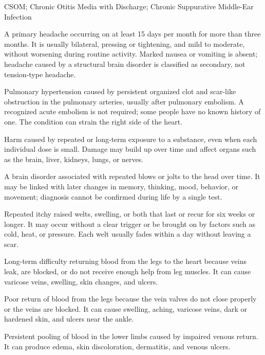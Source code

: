 \synonyms
CSOM; Chronic Otitis Media with Discharge; Chronic Suppurative Middle-Ear Infection

 A primary headache occurring on at
least 15 days per month for more than three months. It is usually bilateral,
pressing or tightening, and mild to moderate, without worsening during routine
activity. Marked nausea or vomiting is absent; headache caused by a structural
brain disorder is classified as secondary, not tension-type headache.

 Pulmonary
hypertension caused by persistent organized clot and scar-like obstruction in
the pulmonary arteries, usually after pulmonary embolism. A recognized acute
embolism is not required; some people have no known history of one. The
condition can strain the right side of the heart.

 Harm caused by repeated or long-term exposure to a substance, even when each individual dose is small. Damage may build up over time and affect organs such as the brain, liver, kidneys, lungs, or nerves.

 A brain disorder associated with repeated blows or jolts to the head over time. It may be linked with later changes in memory, thinking, mood, behavior, or movement; diagnosis cannot be confirmed during life by a single test.

 Repeated itchy raised welts, swelling, or both
that last or recur for six weeks or longer. It may occur without a clear
trigger or be brought on by factors such as cold, heat, or pressure. Each
welt usually fades within a day without leaving a scar.

 Long-term difficulty returning blood from the legs to the heart because veins leak, are blocked, or do not receive enough help from leg muscles. It can cause varicose veins, swelling, skin changes, and ulcers.

 Poor return of blood from the legs because the vein valves do not close properly or the veins are blocked. It can cause swelling, aching, varicose veins, dark or hardened skin, and ulcers near the ankle.

 Persistent pooling of blood in the lower limbs caused by impaired venous return. It can produce
edema, skin discoloration, dermatitis, and venous ulcers.


